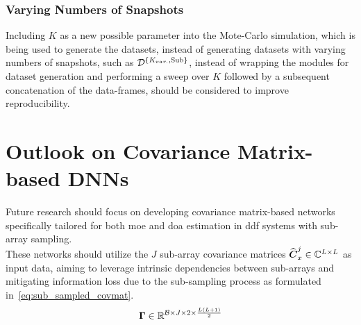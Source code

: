 \subsubsection{Varying Numbers of Snapshots}
Including \( K \) as a new possible parameter into the Mote-Carlo simulation, which is being used to generate the datasets,
instead of generating datasets with varying numbers of snapshots, such as \( \mathcal{D}^{\{K_{var.},\text{Sub}\}} \), instead of wrapping the modules
for dataset generation and performing a sweep over \( K \) followed by a subsequent concatenation of the data-frames, should
be considered to improve reproducibility.

\section{Outlook on Covariance Matrix-based DNNs}

Future research should focus on developing covariance matrix-based networks specifically tailored for both \gls{moe} and
\gls{doa} estimation in \gls{ddf} systems with sub-array sampling. \\
These networks should utilize the \( J \) sub-array covariance matrices \( \widehat{\boldsymbol{C}}_x^{j} \in \mathbb{C}^{L \times L} \) as input data,
aiming to leverage intrinsic dependencies between sub-arrays and mitigating information loss due to the sub-sampling process
as formulated in~\autoref{eq:sub_sampled_covmat}. \\
\begin{equation}
    \boldsymbol{\Gamma} \in \mathbb{R}^{\mathcal{B} \times J  \times 2 \times \frac{L(L+1)}{2}}
    \label{eq:cov_tensor1}
\end{equation}

